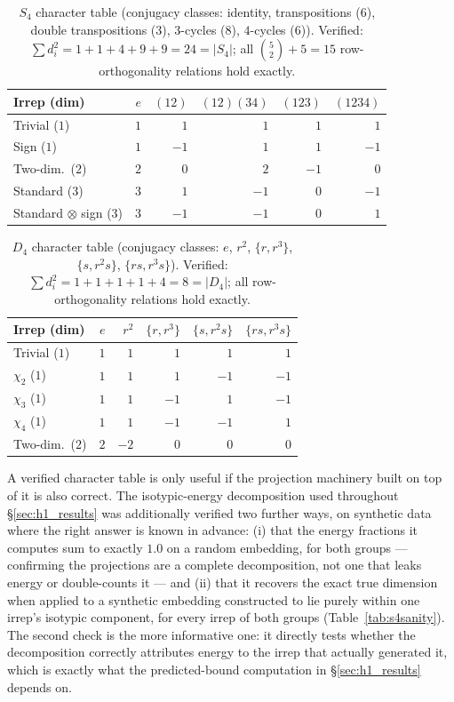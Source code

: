 \documentclass{article}
\begin{document}
\begin{table}[h]
\caption{$S_4$ character table (conjugacy classes: identity, transpositions
($6$), double transpositions ($3$), $3$-cycles ($8$), $4$-cycles ($6$)).
Verified: $\sum d_i^2 = 1+1+4+9+9=24=|S_4|$; all $\binom{5}{2}+5=15$
row-orthogonality relations hold exactly.}
\label{tab:s4chars}
\centering
\small
\begin{tabular}{@{}lrrrrr@{}}
\toprule
Irrep (dim) & $e$ & $(12)$ & $(12)(34)$ & $(123)$ & $(1234)$ \\
\midrule
Trivial ($1$) & $1$ & $1$ & $1$ & $1$ & $1$ \\
Sign ($1$) & $1$ & $-1$ & $1$ & $1$ & $-1$ \\
Two-dim.\ ($2$) & $2$ & $0$ & $2$ & $-1$ & $0$ \\
Standard ($3$) & $3$ & $1$ & $-1$ & $0$ & $-1$ \\
Standard$\,\otimes\,$sign ($3$) & $3$ & $-1$ & $-1$ & $0$ & $1$ \\
\bottomrule
\end{tabular}
\end{table}

\begin{table}[h]
\caption{$D_4$ character table (conjugacy classes: $e$, $r^2$, $\{r,r^3\}$,
$\{s,r^2s\}$, $\{rs,r^3s\}$). Verified: $\sum d_i^2=1+1+1+1+4=8=|D_4|$; all
row-orthogonality relations hold exactly.}
\label{tab:d4chars}
\centering
\small
\begin{tabular}{@{}lrrrrr@{}}
\toprule
Irrep (dim) & $e$ & $r^2$ & $\{r,r^3\}$ & $\{s,r^2s\}$ & $\{rs,r^3s\}$ \\
\midrule
Trivial ($1$) & $1$ & $1$ & $1$ & $1$ & $1$ \\
$\chi_2$ ($1$) & $1$ & $1$ & $1$ & $-1$ & $-1$ \\
$\chi_3$ ($1$) & $1$ & $1$ & $-1$ & $1$ & $-1$ \\
$\chi_4$ ($1$) & $1$ & $1$ & $-1$ & $-1$ & $1$ \\
Two-dim.\ ($2$) & $2$ & $-2$ & $0$ & $0$ & $0$ \\
\bottomrule
\end{tabular}
\end{table}

A verified character table is only useful if the projection machinery
built on top of it is also correct. The isotypic-energy decomposition
used throughout \S\ref{sec:h1_results} was additionally verified two
further ways, on synthetic data where the right answer is known in
advance: (i) that the energy fractions it computes sum to exactly $1.0$
on a random embedding, for both groups --- confirming the projections are
a complete decomposition, not one that leaks energy or double-counts it
--- and (ii) that it recovers the exact true dimension when applied to a
synthetic embedding constructed to lie purely within one irrep's isotypic
component, for every irrep of both groups (Table~\ref{tab:s4sanity}). The
second check is the more informative one: it directly tests whether the
decomposition correctly attributes energy to the irrep that actually
generated it, which is exactly what the predicted-bound computation in
\S\ref{sec:h1_results} depends on.
\end{document}
